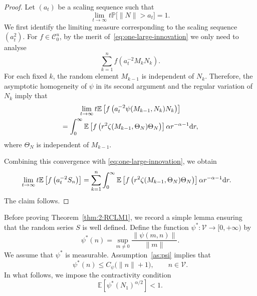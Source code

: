 \documentclass[preprint,12pt]{elsarticle}
\theoremstyle{definition}
\theoremstyle{remark}
\newcommand{\Mbf}{{ M}}
\newcommand{\Nbf}{{ N}}
\newcommand{\Sbf}{{ S}}
\newcommand{\mbf}{{ m}}
\newcommand{\nbf}{{ n}}
\newcommand{\1}{{\mathbf 1}}
\numberwithin{equation}{section}
\newcommand{\Ebb}{\mathbb{E}}  %
\newcommand{\Pbb}{\mathbb{P}}
\newcommand{\ud}{{\rm d}}
\newcommand{\Vcal}{\mathcal{V}}
\newcommand{\Ccal}{\mathcal{C}}
\begin{document}
  \begin{proof}
    Let $(a_t)$ be a scaling sequence such that
    \begin{equation*}
      \lim_{t\to\infty}t\Pbb\bigl[\|\Nbf\|>a_t\bigr]=1.
    \end{equation*}
    We first identify the limiting measure corresponding to the scaling
    sequence $(a_t^2)$. For $f\in\Ccal_0^u$,
    by the merit of~\eqref{eq:one-large-innovation} we only need to analyse 
    \begin{equation*}
        \sum_{k=1}^nf(a_t^{-2}\Mbf_k\Nbf_k).
    \end{equation*}
    For each fixed $k$, the random element $\Mbf_{k-1}$ is independent of
    $\Nbf_k$. Therefore, the asymptotic homogeneity of $\psi$ in its second
    argument and the regular variation of $\Nbf_k$ imply that
    \begin{multline*}
      \lim_{t\to\infty}
      t\Ebb\left[
        f\left(
          a_t^{-2}\psi(\Mbf_{k-1},\Nbf_k)\Nbf_k
        \right)
      \right] \\
      =
      \int_0^\infty
      \Ebb\left[
        f\left(
          r^2
          \zeta(\Mbf_{k-1},\Theta_\Nbf)
          \Theta_\Nbf
        \right)
      \right]
      \alpha r^{-\alpha-1}\ud r,
    \end{multline*}
    where $\Theta_\Nbf$ is independent of $\Mbf_{k-1}$.

    Combining this convergence with
    \eqref{eq:one-large-innovation}, we obtain
    \begin{align*}
      \lim_{t\to\infty}
      t\Ebb\left[f\left(a_t^{-2}\Sbf_n\right)\right]
      &=
      \sum_{k=1}^n
      \int_0^\infty
      \Ebb\left[
        f\left(
          r^2
          \zeta(\Mbf_{k-1},\Theta_\Nbf)
          \Theta_\Nbf
        \right)
      \right]
      \alpha r^{-\alpha-1}\ud r.
    \end{align*}
    The claim follows.
  \end{proof}

  Before proving Theorem~\ref{thm:2:RCLM1}, we record a simple lemma ensuring 
  that the random series $\Sbf$ is well defined. Define the function 
  $\psi^*\colon\Vcal\to[0,+\infty)$ by
  \begin{equation*}
    \psi^*(\nbf)
    =
    \sup_{\mbf\neq0}
    \frac{\|\psi(\mbf,\nbf)\|}{\|\mbf\|}.
  \end{equation*}
  We assume that $\psi^*$ is measurable. Assumption~\ref{as:psi} implies that
  \begin{equation*}
    \psi^*(\nbf)
    \leq C_\psi\bigl(\|\nbf\|+1\bigr),
    \qquad \nbf\in\Vcal.
  \end{equation*}
  In what follows, we impose the contractivity condition
  \begin{equation}\label{eq:2:contr}
    \Ebb\left[\psi^*(\Nbf_1)^{\alpha/2}\right]<1.
  \end{equation}
\end{document}

